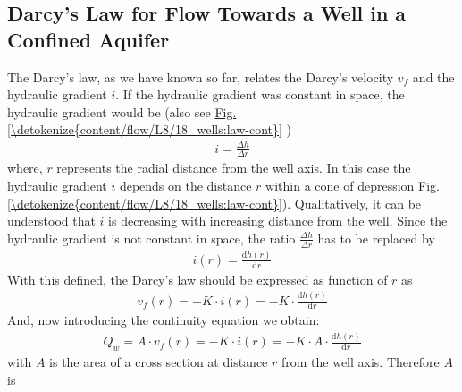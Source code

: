 \documentclass[letterpaper,10pt,english]{jupyterBook}
\begin{document}
\subsection{Darcy’s Law for Flow Towards a Well in a Confined Aquifer}
\label{\detokenize{content/flow/L8/18_wells:darcy-s-law-for-flow-towards-a-well-in-a-confined-aquifer}}
\sphinxAtStartPar
The Darcy’s law, as we have known so far,  relates the Darcy’s velocity \(v_f\) and the hydraulic gradient \(i\). If the hydraulic gradient was constant in space, the hydraulic gradient would be (also see \hyperref[\detokenize{content/flow/L8/18_wells:law-cont}]{Fig.\@ \ref{\detokenize{content/flow/L8/18_wells:law-cont}}} )
\begin{equation*}
\begin{split}
i = \frac{\Delta h}{\Delta r}
\end{split}
\end{equation*}
\sphinxAtStartPar
where, \(r\) represents the radial distance from the well axis. In this case the hydraulic gradient \(i\) depends on the distance \(r\) within a cone of depression \hyperref[\detokenize{content/flow/L8/18_wells:law-cont}]{Fig.\@ \ref{\detokenize{content/flow/L8/18_wells:law-cont}}}). Qualitatively, it can be understood that \(i\) is decreasing with increasing distance from the well. Since the hydraulic gradient is not constant in space, the ratio \(\frac{\Delta h}{\Delta r}\) has to be replaced by
\begin{equation*}
\begin{split}
i(r) = \frac{\textrm{d} h (r)}{\textrm{d} r} \tag{C1}
\end{split}
\end{equation*}
\sphinxAtStartPar
With this defined, the Darcy’s law should be expressed as function of \(r\) as
\begin{equation*}
\begin{split}
v_f (r) = - K\cdot i(r) = - K \cdot \frac{\textrm{d} h (r)}{\textrm{d} r} \tag{C2}
\end{split}
\end{equation*}
\sphinxAtStartPar
And, now introducing the continuity equation we obtain:
\begin{equation*}
\begin{split}
Q_w = A\cdot v_f (r) = - K\cdot i(r) = - K \cdot A\cdot\frac{\textrm{d} h (r)}{\textrm{d} r} \tag{C3}
\end{split}
\end{equation*}
\sphinxAtStartPar
with \(A\) is the area of a cross section at distance \(r\) from the well axis. Therefore \(A\) is
\end{document}
